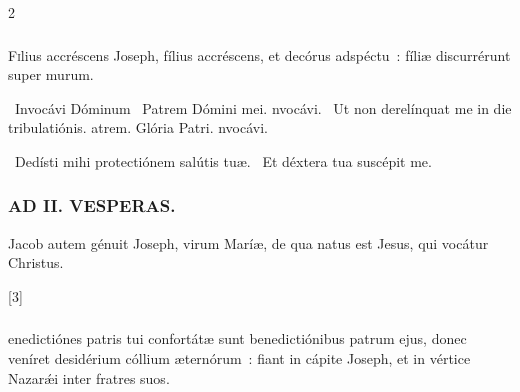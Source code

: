 \documentclass[9pt,twoside]{extarticle}
\begin{document}
\begin{multicols}{2}
{\subsubsection*{}
\lettrine{F}ilius accréscens Joseph, fílius accréscens, et decórus adspéctu~: fíliæ discurrérunt super murum.

\begin{tightlist}{}
\item {}~Invocávi Dóminum \textred{*}~Patrem Dómini mei. nvocávi. ~Ut non derelínquat me in die tribulatiónis. atrem. Glória Patri. nvocávi.
\item {}~Dedísti mihi protectiónem salútis tuæ. ~Et déxtera tua suscépit me.
\end{tightlist}

\subsubsection*{\center \textsc{AD II. VESPERAS.}}
\begin{tightlist}{}
\item {} Jacob autem génuit Joseph, virum Maríæ, de qua natus est Jesus, qui vocátur Christus. 
\item {} [3]
\end{tightlist}

\subsubsection*{}
enedictiónes patris tui confortátæ sunt benedictiónibus patrum ejus, donec veníret desidérium cóllium æternórum~: fiant in cápite Joseph, et in vértice Nazarǽi inter fratres suos.

}
\end{multicols}
\end{document}
